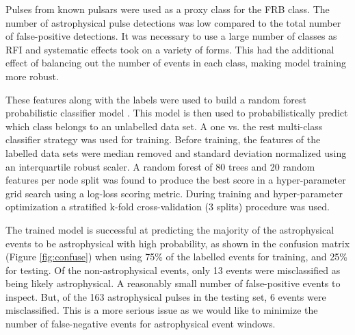 \documentclass[a4paper,fleqn,usenatbib]{mnras}
\begin{document}
Pulses from known pulsars were used as a proxy class for the FRB class. The
number of astrophysical pulse detections was low compared to the total number of
false-positive detections. It was necessary to use a large number of classes
as RFI and systematic effects took on a variety of forms.  This had the
additional effect of balancing out the number of events in each class, making
model training more robust.

These features along with the labels were used to build a random forest
probabilistic classifier model \citep{Ho:1995:RDF:844379.844681,Breiman2001}.
This model is then used to probabilistically predict which class belongs to an
unlabelled data set. A one vs. the rest multi-class classifier strategy was used
for training. Before training, the features of the labelled data sets were
median removed and standard deviation normalized using an interquartile robust
scaler.  A random forest of 80 trees and 20 random features per node split was
found to produce the best score in a hyper-parameter grid search using a
log-loss scoring metric. During training and hyper-parameter optimization a
stratified k-fold cross-validation (3 splits)
\citep{Kohavi:1995:SCB:1643031.1643047} procedure was used.

The trained model is successful at predicting the majority of the astrophysical
events to be astrophysical with high probability, as shown in the confusion
matrix (Figure \ref{fig:confuse}) when using 75\% of the labelled events for
training, and 25\% for testing. Of the non-astrophysical events, only 13 events
were misclassified as being likely astrophysical. A reasonably small number of
false-positive events to inspect. But, of the 163 astrophysical pulses in the
testing set, 6 events were misclassified. This is a more serious issue as we
would like to minimize the number of false-negative events for astrophysical
event windows.
\end{document}
